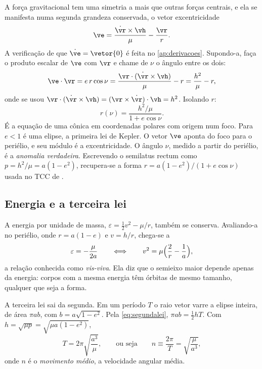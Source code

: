 A força gravitacional tem uma simetria a mais que outras forças centrais, e ela se manifesta numa segunda grandeza conservada, o vetor excentricidade
\begin{equation}
  \ve = \frac{\dot{\vr}\times\vh}{\mu} - \frac{\vr}{r}.
  \label{eq:lrl}
\end{equation}
A verificação de que $\dot{\ve} = \vetor{0}$ é feita no \autoref{ap:derivacoes}. Supondo-a, faça o produto escalar de $\ve$ com $\vr$ e chame de $\nu$ o ângulo entre os dois:
\[
  \ve\cdot\vr = e\,r\cos\nu = \frac{\vr\cdot(\dot{\vr}\times\vh)}{\mu} - r = \frac{h^2}{\mu} - r,
\]
onde se usou $\vr\cdot(\dot{\vr}\times\vh) = (\vr\times\dot{\vr})\cdot\vh = h^2$. Isolando $r$:
\begin{equation}
  r(\nu) = \frac{h^2/\mu}{1 + e\cos\nu}.
  \label{eq:conica}
\end{equation}
É a equação de uma cônica em coordenadas polares com origem num foco. Para $e<1$ é uma elipse, a primeira lei de Kepler. O vetor $\ve$ aponta do foco para o periélio, e seu módulo é a excentricidade. O ângulo $\nu$, medido a partir do periélio, é a \emph{anomalia verdadeira}. Escrevendo o semilatus rectum como $p = h^2/\mu = a(1-e^2)$, recupera-se a forma $r = a(1-e^2)/(1+e\cos\nu)$ usada no TCC de .

\subsection{Energia e a terceira lei}

A energia por unidade de massa, $\varepsilon = \tfrac12 v^2 - \mu/r$, também se conserva. Avaliando-a no periélio, onde $r = a(1-e)$ e $v = h/r$, chega-se a
\begin{equation}
  \varepsilon = -\frac{\mu}{2a}
  \qquad\Longleftrightarrow\qquad
  v^2 = \mu\Bigl(\frac{2}{r} - \frac{1}{a}\Bigr),
  \label{eq:visviva}
\end{equation}
a relação conhecida como \emph{vis-viva}. Ela diz que o semieixo maior depende apenas da energia: corpos com a mesma energia têm órbitas de mesmo tamanho, qualquer que seja a forma.

A terceira lei sai da segunda. Em um período $T$ o raio vetor varre a elipse inteira, de área $\pi ab$, com $b = a\sqrt{1-e^2}$. Pela \autoref{eq:segundalei}, $\pi ab = \tfrac12 h T$. Com $h = \sqrt{\mu p} = \sqrt{\mu a(1-e^2)}$,
\begin{equation}
  T = 2\pi\sqrt{\frac{a^3}{\mu}},
  \qquad\text{ou seja}\qquad
  n \equiv \frac{2\pi}{T} = \sqrt{\frac{\mu}{a^3}},
  \label{eq:terceiralei}
\end{equation}
onde $n$ é o \emph{movimento médio}, a velocidade angular média.

